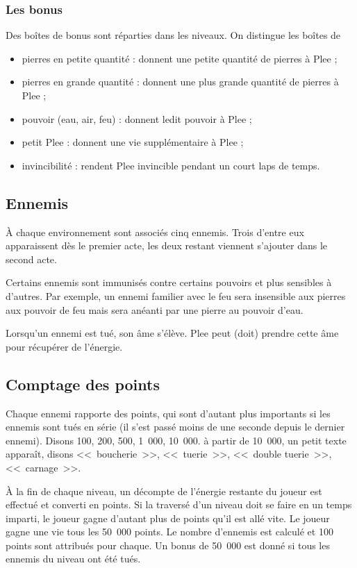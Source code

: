 \documentclass{article}
\begin{document}
\subsubsection{Les bonus}
Des boîtes de bonus sont réparties dans les niveaux. On distingue les
boîtes de
\begin{itemize}
\item pierres en petite quantité : donnent une petite quantité de
      pierres à Plee ;
\item pierres en grande quantité : donnent une plus grande quantité de
      pierres à Plee ;
\item pouvoir (eau, air, feu) : donnent ledit pouvoir à Plee ;
\item petit Plee : donnent une vie supplémentaire à Plee ;
\item invincibilité : rendent Plee invincible pendant un court laps de
      temps.
\end{itemize}

\subsection{Ennemis}
À chaque environnement sont associés cinq ennemis. Trois d'entre eux
apparaissent dès le premier acte, les deux restant viennent s'ajouter
dans le second acte.

Certains ennemis sont immunisés contre certains pouvoirs et plus
sensibles à d'autres. Par exemple, un ennemi familier avec le feu sera
insensible aux pierres aux pouvoir de feu mais sera anéanti par une
pierre au pouvoir d'eau.

Lorsqu'un ennemi est tué, son âme s'élève. Plee peut (doit) prendre
cette âme pour récupérer de l'énergie.

\subsection{Comptage des points}
Chaque ennemi rapporte des points, qui sont d'autant plus importants
si les ennemis sont tués en série (il s'est passé moins de une seconde
depuis le dernier ennemi). Disons 100, 200, 500, 1~000, 10~000. à
partir de 10~000, un petit texte apparaît, disons <<~boucherie~>>,
<<~tuerie~>>, <<~double tuerie~>>, <<~carnage~>>.

À la fin de chaque niveau, un décompte de l'énergie restante du joueur
est effectué et converti en points. Si la traversé
d'un niveau doit se faire en un temps imparti, le joueur gagne
d'autant plus de points qu'il est allé vite. Le joueur gagne une vie
tous les 50~000 points. Le nombre d'ennemis est calculé et 100 points
sont attribués pour chaque. Un bonus de 50~000 est donné si tous les
ennemis du niveau ont été tués.
\end{document}
